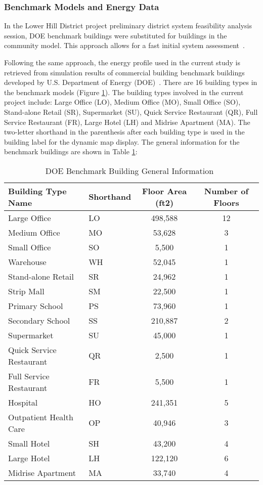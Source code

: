 \documentclass[hidelinks,12pt]{article}
\newcommand{\fref}[1]{Figure \ref{#1}}
\newcommand{\tref}[1]{Table \ref{#1}}
\begin{document}
\subsubsection{Benchmark Models and Energy Data}
In the Lower Hill District project preliminary district system
feasibility analysis session, DOE benchmark buildings were substituted
for buildings in the community model. This approach allows for a fast
initial system assessment~\cite{baird2014}.

Following the same approach, the energy profile used in the current
study is retrieved from simulation results of commercial building
benchmark buildings developed by U.S. Department of Energy
(DOE)~\cite{DOE2015}. There are 16 building types in the benchmark
models (\fref{tab:doeModel}). The building types involved in the
current project include: Large Office (LO), Medium Office (MO), Small
Office (SO), Stand-alone Retail (SR), Supermarket (SU), Quick Service
Restaurant (QR), Full Service Restaurant (FR), Large Hotel (LH) and
Midrise Apartment (MA). The two-letter shorthand in the parenthesis
after each building type is used in the building label for the dynamic
map display. The general information for the benchmark buildings are
shown in \tref{tab:doeModel}:

\begin{table}[h!]
  \centering
  \begin{tabular}{l|l|c|c}
    \hline
Building Type Name&Shorthand&  Floor Area (ft2)    & Number of Floors\\
    \hline
Large Office	         &LO&  498,588	      & 12\\
Medium Office	         &MO&  53,628	      & 3\\
Small Office	         &SO&  5,500	      & 1\\
Warehouse	         &WH&  52,045	      & 1\\
Stand-alone Retail       &SR&  24,962	      & 1\\
Strip Mall	         &SM&  22,500	      & 1\\
Primary School	         &PS&  73,960	      & 1\\
Secondary School         &SS&  210,887	      & 2\\
Supermarket	         &SU&  45,000	      & 1\\
Quick Service Restaurant &QR&  2,500          & 1\\
Full Service Restaurant  &FR&  5,500          & 1\\
Hospital	         &HO&  241,351	      & 5\\
Outpatient Health Care   &OP&  40,946	      & 3\\
Small Hotel	         &SH&  43,200	      & 4\\
Large Hotel	         &LH&  122,120	      & 6\\
Midrise Apartment        &MA&  33,740	      & 4\\
    \hline
\end{tabular}
\caption{DOE Benchmark Building General Information~\cite{DOE2015}}
\label{tab:doeModel}
\end{table}
\end{document}
